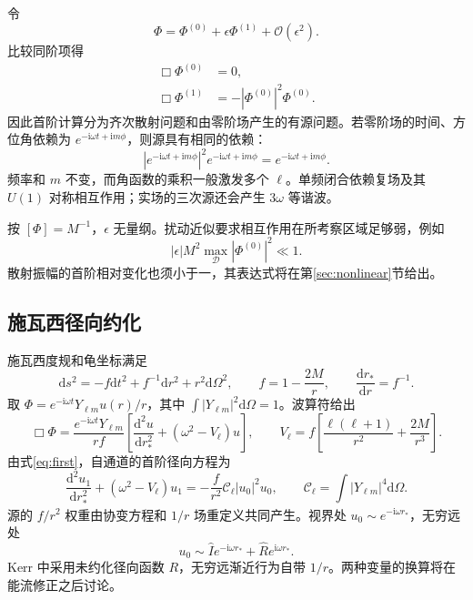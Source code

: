 \documentclass[UTF8,fontset=fandol,11pt,a4paper]{ctexart}
\newcommand{\ii}{\mathrm i}
\newcommand{\dd}{\mathrm d}
\newcommand{\calO}{\mathcal O}
\numberwithin{equation}{section}
\begin{document}
令
\begin{equation}
\Phi=\Phi^{(0)}+\epsilon\Phi^{(1)}+\calO(\epsilon^2).
\end{equation}
比较同阶项得
\begin{align}
\Box\Phi^{(0)}&=0,\label{eq:zero}\\
\Box\Phi^{(1)}&=-|\Phi^{(0)}|^2\Phi^{(0)}.\label{eq:first}
\end{align}
因此首阶计算分为齐次散射问题和由零阶场产生的有源问题。若零阶场的时间、方位角依赖为 $e^{-\ii\omega t+\ii m\phi}$，则源具有相同的依赖：
\begin{equation}
|e^{-\ii\omega t+\ii m\phi}|^2e^{-\ii\omega t+\ii m\phi}=e^{-\ii\omega t+\ii m\phi}.
\end{equation}
频率和 $m$ 不变，而角函数的乘积一般激发多个 $\ell$。单频闭合依赖复场及其 $U(1)$ 对称相互作用；实场的三次源还会产生 $3\omega$ 等谐波。

按 $[\Phi]=M^{-1}$，$\epsilon$ 无量纲。扰动近似要求相互作用在所考察区域足够弱，例如
\begin{equation}
|\epsilon|M^2\max_{\mathcal D}|\Phi^{(0)}|^2\ll1.
\end{equation}
散射振幅的首阶相对变化也须小于一，其表达式将在第\ref{sec:nonlinear}节给出。

\subsection{施瓦西径向约化}
施瓦西度规和龟坐标满足
\begin{equation}
\dd s^2=-f\dd t^2+f^{-1}\dd r^2+r^2\dd\Omega^2,
\qquad f=1-\frac{2M}{r},\qquad \frac{\dd r_*}{\dd r}=f^{-1}.
\end{equation}
取 $\Phi=e^{-\ii\omega t}Y_{\ell m}u(r)/r$，其中 $\int|Y_{\ell m}|^2\dd\Omega=1$。波算符给出
\begin{equation}
\Box\Phi=\frac{e^{-\ii\omega t}Y_{\ell m}}{rf}
\left[\frac{\dd^2u}{\dd r_*^2}+(\omega^2-V_\ell)u\right],
\qquad V_\ell=f\left[\frac{\ell(\ell+1)}{r^2}+\frac{2M}{r^3}\right].
\end{equation}
由式\eqref{eq:first}，自通道的首阶径向方程为
\begin{equation}
\frac{\dd^2u_1}{\dd r_*^2}+(\omega^2-V_\ell)u_1
=-\frac{f}{r^2}\mathcal C_\ell|u_0|^2u_0,
\qquad \mathcal C_\ell=\int|Y_{\ell m}|^4\dd\Omega.
\end{equation}
源的 $f/r^2$ 权重由协变方程和 $1/r$ 场重定义共同产生。视界处 $u_0\sim e^{-\ii\omega r_*}$，无穷远处
\begin{equation}
u_0\sim\widehat I e^{-\ii\omega r_*}+\widehat R e^{\ii\omega r_*}.
\end{equation}
Kerr 中采用未约化径向函数 $R$，无穷远渐近行为自带 $1/r$。两种变量的换算将在能流修正之后讨论。
\end{document}
